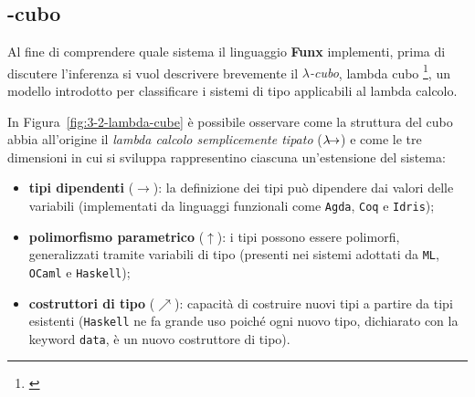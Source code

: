 \subsection{\texorpdfstring{\textlambda}{lambda}-cubo}
\label{sec:3-2-lambda-cube}

Al fine di comprendere quale sistema il linguaggio \textbf{Funx} implementi,
prima di discutere l'inferenza si vuol descrivere brevemente il \textit{$\lambda$-cubo}, lambda cubo%
\footnote{ \cite{Barendregt-1991-GeneralizedSystems}},
un modello introdotto per classificare i sistemi di tipo applicabili al lambda calcolo.

\noindent In Figura~\ref{fig:3-2-lambda-cube} è possibile osservare come la struttura del cubo abbia all'origine
il \textit{lambda calcolo semplicemente tipato} ($\lambda\mkern-9mu\rightarrow$) e come le tre dimensioni
in cui si sviluppa rappresentino ciascuna un'estensione del sistema:
\begin{itemize}
    \item \textbf{tipi dipendenti} ($\rightarrow$): la definizione dei tipi può dipendere dai valori delle variabili
          (implementati da linguaggi funzionali come \texttt{Agda}, \texttt{Coq} e \texttt{Idris});
    \item \textbf{polimorfismo parametrico} ($\uparrow$): i tipi possono essere polimorfi, generalizzati
          tramite variabili di tipo (presenti nei sistemi adottati da \texttt{ML}, \texttt{OCaml} e \texttt{Haskell});
    \item \textbf{costruttori di tipo} ($\nearrow$): capacità di costruire nuovi tipi a partire da tipi esistenti
          (\texttt{Haskell} ne fa grande uso poiché ogni nuovo tipo,
          dichiarato con la keyword \texttt{data}, è un nuovo costruttore di tipo).
\end{itemize}

